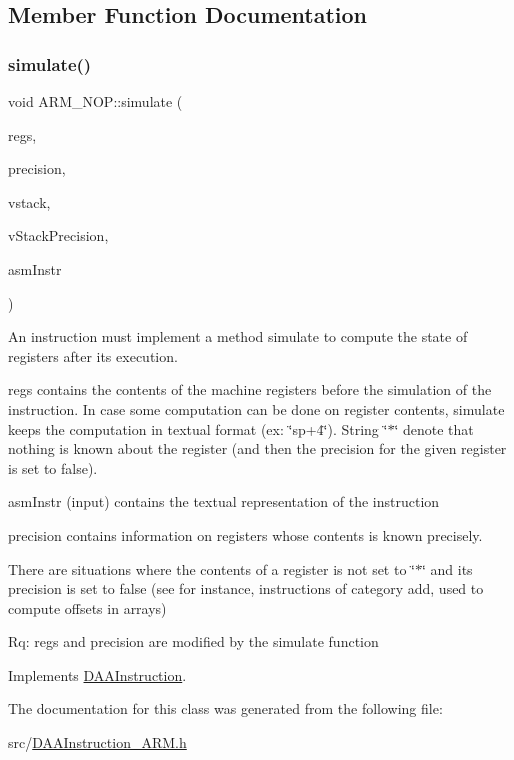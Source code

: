 \subsection{Member Function Documentation}
\mbox{\label{classARM__NOP_a9a78eb5aae1d48b00841d9581591840a}} 
\subsubsection{\texorpdfstring{simulate()}{simulate()}}
{\footnotesize\ttfamily void A\+R\+M\+\_\+\+N\+O\+P\+::simulate (\begin{DoxyParamCaption}\item[{\hyperlink{DAAInstruction_8h_af0fae93a861de9cf37988d5673cac523}{reg\+Table} \&}]{regs,  }\item[{\hyperlink{DAAInstruction_8h_a0e8cae02815a5f8adc750122d790b455}{reg\+Precision\+Table} \&}]{precision,  }\item[{\hyperlink{DAAInstruction_8h_a1b0e70ac1a04f06c8132055ed01f589f}{stack\+Type} \&}]{vstack,  }\item[{\hyperlink{DAAInstruction_8h_ac5cb793e9dac3fa9693da78b7e29ab30}{stack\+Prec\+Type} \&}]{v\+Stack\+Precision,  }\item[{const string \&}]{asm\+Instr }\end{DoxyParamCaption})\hspace{0.3cm}{\ttfamily [virtual]}}

An instruction must implement a method simulate to compute the state of registers after its execution.

regs contains the contents of the machine registers before the simulation of the instruction. In case some computation can be done on register contents, simulate keeps the computation in textual format (ex\+: \char`\"{}sp+4\char`\"{}). String \char`\"{}$\ast$\char`\"{} denote that nothing is known about the register (and then the precision for the given register is set to false).

asm\+Instr (input) contains the textual representation of the instruction

precision contains information on registers whose contents is known precisely.

There are situations where the contents of a register is not set to \char`\"{}$\ast$\char`\"{} and its precision is set to false (see for instance, instructions of category add, used to compute offsets in arrays)

Rq\+: regs and precision are modified by the simulate function 

Implements \hyperlink{classDAAInstruction_a61d0b9bece1e0ead89a46c0197276324}{D\+A\+A\+Instruction}.



The documentation for this class was generated from the following file\+:\begin{DoxyCompactItemize}
\item 
src/\hyperlink{DAAInstruction__ARM_8h}{D\+A\+A\+Instruction\+\_\+\+A\+R\+M.\+h}\end{DoxyCompactItemize}
